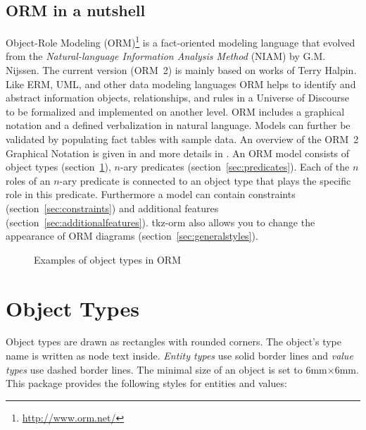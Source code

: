\documentclass[a4paper,10pt]{article}
\begin{document}
\subsection*{ORM in a nutshell}
Object-Role Modeling (ORM)\footnote{\url{http://www.orm.net/}} is a fact-oriented modeling language that evolved from the \textit{Natural-language Information Analysis Method} (NIAM) by G.M. Nijssen. The current version (ORM~2) is mainly based on works of Terry Halpin. Like ERM, UML, and other data modeling languages ORM helps to identify and abstract information objects, relationships, and rules in a Universe of Discourse to be formalized and implemented on another level. ORM includes a graphical notation and a defined verbalization in natural language. Models can further be validated by populating fact tables with sample data. An overview of the ORM~2 Graphical Notation is given in \cite{Halpin2005} and more details in \cite{Halpin2008}. An ORM model consists of object types (section~\ref{sec:objecttypes}), $n$-ary predicates  (section~\ref{sec:predicates}). Each of the $n$ roles of an $n$-ary predicate is connected to an object type that plays the specific role in this predicate. Furthermore a model can contain constraints (section~\ref{sec:constraints}) and additional features (section~\ref{sec:additionalfeatures}). \textsf{tkz-orm} also allows you to change the appearance of ORM diagrams (section~\ref{sec:generalstyles}).

\begin{figure}[ht]
  \caption{Examples of object types in ORM}
\end{figure}

\pagebreak
\section{Object Types}
\label{sec:objecttypes}
Object types are drawn as rectangles with rounded corners. The object's type name is written as node text inside. \emph{Entity types} use solid border lines and \emph{value types} use dashed border lines. The minimal size of an object is set to 6mm$\times$6mm. This package provides the following styles for entities and values:
\end{document}
